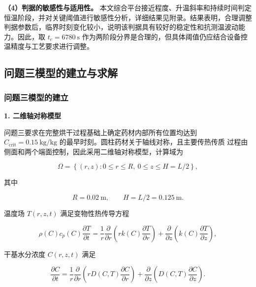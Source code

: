 \documentclass[12pt,a4paper]{ctexart}
\begin{document}
\textbf{（4）判据的敏感性与适用性。}
本文综合平台接近程度、升温斜率和持续时间判定恒温阶段，并对关键阈值进行敏感性分析，详细结果见附录。结果表明，合理调整判据参数后，临界时刻变化较小，说明该判据具有较好的稳定性和抗测温波动能力。因此，取 $t_c=6780\ \mathrm{s}$ 作为两阶段分界是合理的，但具体阈值仍应结合设备控温精度与工艺要求进行调整。




\subsection{问题三模型的建立与求解}
\subsubsection{问题三模型的建立}
\textbf{1. 二维轴对称模型}

问题三要求在完整烘干过程基础上确定药材内部所有位置均达到
$C_{\mathrm{crit}}=0.15\ \mathrm{kg/kg}$ 的最早时刻。圆柱药材关于轴线对称，且主要传热传质
过程由侧面和两个端面控制，因此采用二维轴对称模型，计算域为

\begin{equation}
\Omega=\left\{(r,z):0\le r\le R,\ 0\le z\le H=L/2\right\},
\label{eq:p3domain}
\end{equation}

其中

\begin{equation}
R=0.02\ \mathrm{m},\qquad H=L/2=0.125\ \mathrm{m}.
\label{eq:p3geometry}
\end{equation}

温度场 $T(r,z,t)$ 满足变物性热传导方程

\begin{equation}
\rho(C)c_p(C)\frac{\partial T}{\partial t}
=
\frac{1}{r}\frac{\partial}{\partial r}
\left(rk(C)\frac{\partial T}{\partial r}\right)
+
\frac{\partial}{\partial z}
\left(k(C)\frac{\partial T}{\partial z}\right),
\label{eq:p3heat}
\end{equation}

干基水分浓度 $C(r,z,t)$ 满足

\begin{equation}
\frac{\partial C}{\partial t}
=
\frac{1}{r}\frac{\partial}{\partial r}
\left(rD(C,T)\frac{\partial C}{\partial r}\right)
+
\frac{\partial}{\partial z}
\left(D(C,T)\frac{\partial C}{\partial z}\right).
\label{eq:p3mass}
\end{equation}
\end{document}
